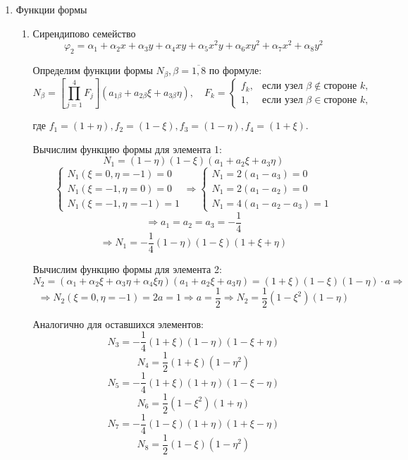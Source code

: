 \documentclass[a4paper, 12pt]{article}
\begin{document}
	\begin{enumerate}
		\item Функции формы
		\begin{enumerate}
			\item Сирендипово семейство
			\[
				\varphi_2=\alpha_1+\alpha_2x+\alpha_3y+\alpha_4xy+\alpha_5x^2y+\alpha_6xy^2+\alpha_7x^2+\alpha_8y^2 
			\]

			Определим функции формы $N_{\beta}, \beta = \overline{1, 8}$ по формуле:
			\[
				N_{\beta} = \left[\prod_{j=1}^{4} F_j \right] 
				\left( a_{1\beta} + a_{2\beta}\xi + a_{3\beta}\eta \right), \quad
				F_k =
				\begin{cases} 
				f_k, & \text{если узел } \beta \notin \text{стороне } k, \\
				1, & \text{если узел } \beta \in \text{стороне } k,
				\end{cases}
			\]

			где $f_1 = (1 + \eta), f_2 = (1 - \xi), f_3 = (1 - \eta), f_4 = (1 + \xi)$.

			Вычислим функцию формы для элемента 1:
			\[
				N_1=(1-\eta)(1-\xi)(a_1+a_2\xi+a_3\eta) 
			\]
			\[ \begin{cases}
				N_1(\xi=0, \eta=-1)=0 \\
				N_1(\xi=-1, \eta=0) =0 \\
				N_1(\xi=-1, \eta=-1) = 1 \end{cases} \Rightarrow \begin{cases} N_1=2(a_1-a_3)=0 \\ N_1=2(a_1-a_2)=0 \\ N_1 = 4(a_1-a_2-a_3)=1  \end{cases}
			\]
			\[
			\Rightarrow a_1=a_2=a_3=-\frac{1}{4} 
			\]
			\[
				\Rightarrow N_1=-\frac{1}{4}(1-\eta)(1-\xi)(1+\xi+\eta) 
			\]

			Вычислим функцию формы для элемента 2:
			\[
			N_2=(\alpha_1+\alpha_2\xi+\alpha_3\eta+\alpha_4\xi\eta)(a_1+a_2\xi+a_3\eta)=(1+\xi)(1-\xi)(1-\eta)\cdot a \Rightarrow
			\]
			\[
				\Rightarrow 
				N_2(\xi=0, \eta=-1)=2a=1\Rightarrow a=\frac{1}{2} \Rightarrow N_2=\frac{1}{2}(1-\xi^2)(1-\eta)
			\]

			Аналогично для оставшихся элементов:
			\[
				N_3 = -\frac{1}{4}(1 + \xi)(1 - \eta)(1 - \xi + \eta)
			\]
			\[
				N_4 = \frac{1}{2}(1 + \xi)(1 - \eta^2)
			\]
			\[
				N_5 = -\frac{1}{4}(1 + \xi)(1 + \eta)(1 - \xi - \eta)
			\]
			\[
				N_6 = \frac{1}{2}(1 - \xi^2)(1 + \eta)
			\]
			\[
				N_7 = -\frac{1}{4}(1 - \xi)(1 + \eta)(1 + \xi - \eta)
			\]
			\[
				N_8 = \frac{1}{2}(1 - \xi)(1 - \eta^2)
			\]


\end{enumerate}
\end{enumerate}
\end{document}
